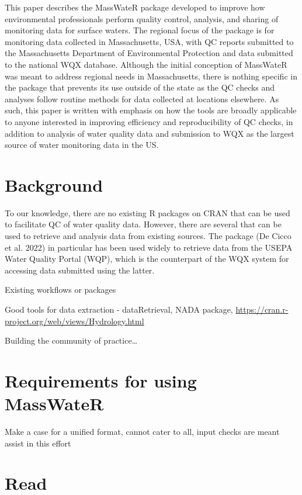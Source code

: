 This paper describes the MassWateR package developed to improve how environmental professionals perform quality control, analysis, and sharing of monitoring data for surface waters. The regional focus of the package is for monitoring data collected in Massachusetts, USA, with QC reports submitted to the Massachusetts Department of Environmental Protection and data submitted to the national WQX database. Although the initial conception of MassWateR was meant to address regional needs in Massachusetts, there is nothing specific in the package that prevents its use outside of the state as the QC checks and analyses follow routine methods for data collected at locations elsewhere. As such, this paper is written with emphasis on how the tools are broadly applicable to anyone interested in improving efficiency and reproducibility of QC checks, in addition to analysis of water quality data and submission to WQX as the largest source of water monitoring data in the US.

\hypertarget{background}{%
\section{Background}\label{background}}

To our knowledge, there are no existing R packages on CRAN that can be used to facilitate QC of water quality data. However, there are several that can be used to retrieve and analysis data from existing sources. The  package (De Cicco et al. 2022) in particular has been used widely to retrieve data from the USEPA Water Quality Portal (WQP), which is the counterpart of the WQX system for accessing data submitted using the latter.

Existing workflows or packages

Good tools for data extraction - dataRetrieval, NADA package, \url{https://cran.r-project.org/web/views/Hydrology.html}

Building the community of practice\ldots{}

\hypertarget{requirements-for-using-masswater}{%
\section{Requirements for using MassWateR}\label{requirements-for-using-masswater}}

Make a case for a unified format, cannot cater to all, input checks are meant assist in this effort

\hypertarget{read}{%
\section{Read}\label{read}}

